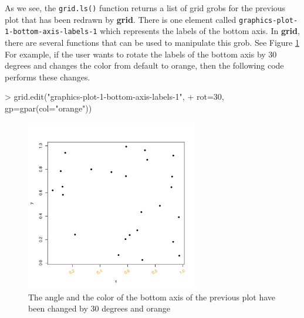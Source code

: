 \documentclass[11pt,twoside]{report}
\begin{document}
As we see, the \texttt{grid.ls()} function returns a list of grid grobs for the previous plot that has been redrawn by \textbf{grid}. There is one element called \texttt{graphics-plot-1-bottom-axis-labels-1} which represents the labels of the bottom axis. In \textbf{grid}, there are several functions that can be used to manipulate this grob. See Figure \ref{figure_1.2} \\
For example, if the user wants to rotate the labels of the bottom axis by 30 degrees and changes the color from default to orange, then the following code performs these changes.
\begin{Schunk}
\begin{Sinput}
> grid.edit("graphics-plot-1-bottom-axis-labels-1", 
+           rot=30, gp=gpar(col="orange"))
\end{Sinput}
\end{Schunk}

\begin{figure}[h]
	\begin{center}
		\includegraphics[height = 7.5cm, width = 7.5cm]{figure/report_basic_demo_4.pdf}
		\caption{The angle and the color of the bottom axis of the previous plot have been changed by 30 degrees and orange}
		\label{figure_1.2}
	\end{center}
\end{figure}

\newpage
\end{document}
